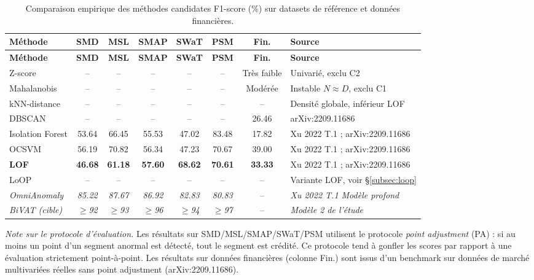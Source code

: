 \documentclass[12pt,a4paper]{article}
\newcommand{\nd}{--}
\begin{document}
\begin{longtable}{p{3.5cm}ccccccp{2.5cm}}
\caption{Comparaison empirique des méthodes candidates  F1-score (\%) sur
datasets de référence et données financières.}
\label{tab:selection}\\
\toprule
\textbf{Méthode} & \textbf{SMD} & \textbf{MSL} & \textbf{SMAP} &
\textbf{SWaT} & \textbf{PSM} & \textbf{Fin.} & \textbf{Source} \\
\midrule
\endfirsthead
\toprule
\textbf{Méthode} & \textbf{SMD} & \textbf{MSL} & \textbf{SMAP} &
\textbf{SWaT} & \textbf{PSM} & \textbf{Fin.} & \textbf{Source} \\
\midrule
\endhead
\bottomrule\endlastfoot

Z-score & \nd & \nd & \nd & \nd & \nd & Très faible &
Univarié, exclu C2 \\
\midrule
Mahalanobis & \nd & \nd & \nd & \nd & \nd & Modérée &
Instable $N \approx D$, exclu C1 \\
\midrule
kNN-distance & \nd & \nd & \nd & \nd & \nd & \nd &
Densité globale, inférieur LOF \\
\midrule
DBSCAN & \nd & \nd & \nd & \nd & \nd & 26.46 &
arXiv:2209.11686 \\
\midrule
Isolation Forest & 53.64 & 66.45 & 55.53 & 47.02 & 83.48 & 17.82 &
Xu 2022 T.1 ; arXiv:2209.11686 \\
\midrule
OCSVM & 56.19 & 70.82 & 56.34 & 47.23 & 70.67 & 39.00 &
Xu 2022 T.1 ; arXiv:2209.11686 \\
\midrule
\textbf{LOF} & \textbf{46.68} & \textbf{61.18} & \textbf{57.60} &
\textbf{68.62} & \textbf{70.61} & \textbf{33.33} &
Xu 2022 T.1 ; arXiv:2209.11686 \\
\midrule
LoOP & \nd & \nd & \nd & \nd & \nd & \nd &
Variante LOF, voir \S\ref{subsec:loop} \\
\midrule
\textit{OmniAnomaly} & \textit{85.22} & \textit{87.67} & \textit{86.92} &
\textit{82.83} & \textit{80.83} & \nd &
\textit{Xu 2022 T.1  Modèle profond} \\
\midrule
\textit{BiVAT (cible)} & \textit{$\geq$92} & \textit{$\geq$93} &
\textit{$\geq$96} & \textit{$\geq$94} & \textit{$\geq$97} & \nd &
\textit{Modèle 2 de l'étude} \\
\end{longtable}

\textit{Note sur le protocole d'évaluation.} Les résultats sur SMD/MSL/SMAP/SWaT/PSM
utilisent le protocole \textit{point adjustment} (PA) : si au moins un point
d'un segment anormal est détecté, tout le segment est crédité. Ce protocole
tend à gonfler les scores par rapport à une évaluation strictement
point-à-point. Les résultats sur données financières (colonne Fin.) sont issus
d'un benchmark sur données de marché multivariées réelles sans point adjustment
(arXiv:2209.11686).
\end{document}
